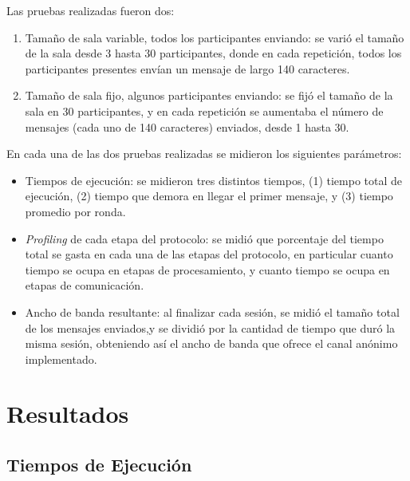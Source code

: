 Las pruebas realizadas fueron dos:

\begin{enumerate}
	\item Tamaño de sala variable, todos los participantes enviando: se 
	varió el tamaño de la sala desde 3 hasta 30 participantes, donde en 
	cada repetición, todos los participantes presentes envían un 
	mensaje de largo 140 caracteres.
	\item Tamaño de sala fijo, algunos participantes enviando: se fijó 
	el tamaño de la sala en 30 participantes, y en cada repetición se 
	aumentaba el número de mensajes (cada uno de 140 caracteres) enviados, 
	desde 1 hasta 30.
\end{enumerate}

En cada una de las dos pruebas realizadas se midieron los siguientes 
parámetros:

\begin{itemize}
	\item Tiempos de ejecución: se midieron tres distintos tiempos, (1) tiempo 
	total de ejecución, (2) tiempo que demora en llegar el primer mensaje, y 
	(3) tiempo promedio por ronda.
	\item \emph{Profiling} de cada etapa del protocolo: se midió que porcentaje 
	del tiempo total se gasta en cada una de las etapas del protocolo, en particular 
	cuanto tiempo se ocupa en etapas de procesamiento, y cuanto tiempo se ocupa 
	en etapas de comunicación.
	\item Ancho de banda resultante: al finalizar cada sesión, se midió el tamaño 
	total de los mensajes enviados,y se dividió por la cantidad de tiempo que 
	duró la misma sesión, obteniendo así el ancho de banda que ofrece el canal 
	anónimo implementado. 
\end{itemize}

\section{Resultados}

\subsection{Tiempos de Ejecución}

